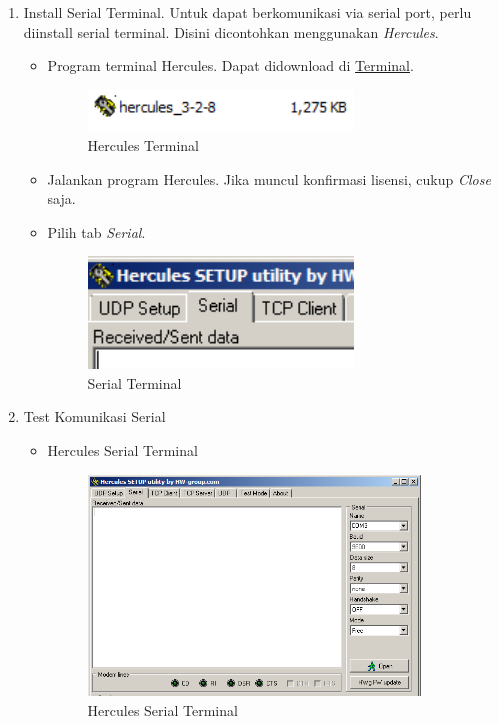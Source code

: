 \documentclass{article}
\begin{document}
\begin{enumerate}
		
		\item Install Serial Terminal.
		Untuk dapat berkomunikasi via serial port, perlu diinstall serial terminal.
		Disini dicontohkan menggunakan \textit{Hercules}.
		
		\begin{itemize}
			\item Program terminal Hercules. Dapat didownload di \href{https://drive.google.com/drive/folders/1fgNPnGeSm20TrFfwmeCa4B24WIN_t_o_?usp=share_link}{Terminal}.
			\begin{figure}[H]
				\centering
				\includegraphics[width=200pt]{images/software/hercules}
				\caption{Hercules Terminal}
			\end{figure}
			
			\item Jalankan program Hercules.
			Jika muncul konfirmasi lisensi, cukup \textit{Close} saja.
			
			\item Pilih tab \textit{Serial}.
			\begin{figure}[H]
				\centering
				\includegraphics[width=200pt]{images/software/hercules_serial}
				\caption{Serial Terminal}
			\end{figure}
		\end{itemize}
		
		\item Test Komunikasi Serial
		\begin{itemize}
			\item Hercules Serial Terminal
			\begin{figure}[H]
				\centering
				\includegraphics[width=250pt]{images/software/hercules_terminal}
				\caption{Hercules Serial Terminal}
			\end{figure}
			

\end{itemize}
\end{enumerate}
\end{document}
